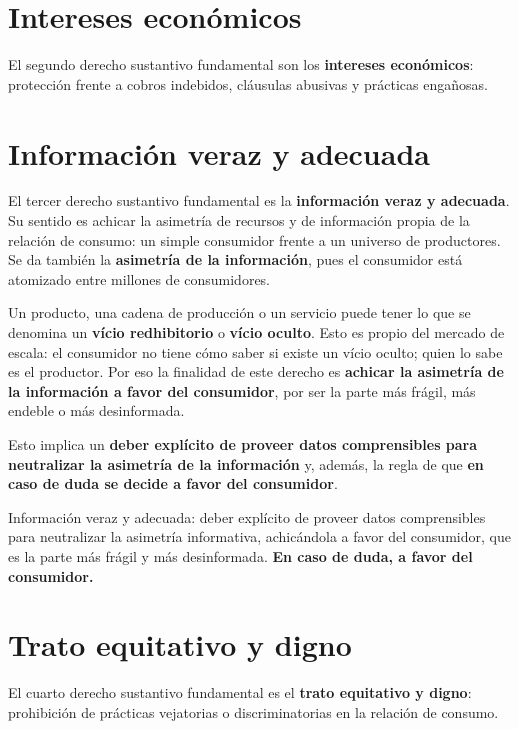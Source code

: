 \documentclass[12pt,oneside]{book}
\begin{document}
\section{Intereses econ\'omicos}

El segundo derecho sustantivo fundamental son los \textbf{intereses econ\'omicos}: protecci\'on frente a cobros indebidos, cl\'ausulas abusivas y pr\'acticas enga\~nosas.

\section{Informaci\'on veraz y adecuada}

El tercer derecho sustantivo fundamental es la \textbf{informaci\'on veraz y adecuada}. Su sentido es achicar la asimetr\'ia de recursos y de informaci\'on propia de la relaci\'on de consumo: un simple consumidor frente a un universo de productores. Se da tambi\'en la \textbf{asimetr\'ia de la informaci\'on}, pues el consumidor est\'a atomizado entre millones de consumidores.

Un producto, una cadena de producci\'on o un servicio puede tener lo que se denomina un \textbf{v\'icio redhibitorio} o \textbf{v\'icio oculto}. Esto es propio del mercado de escala: el consumidor no tiene c\'omo saber si existe un v\'icio oculto; quien lo sabe es el productor. Por eso la finalidad de este derecho es \textbf{achicar la asimetr\'ia de la informaci\'on a favor del consumidor}, por ser la parte m\'as fr\'agil, m\'as endeble o m\'as desinformada.

Esto implica un \textbf{deber expl\'icito de proveer datos comprensibles para neutralizar la asimetr\'ia de la informaci\'on} y, adem\'as, la regla de que \textbf{en caso de duda se decide a favor del consumidor}.

\begin{important}
Informaci\'on veraz y adecuada: deber expl\'icito de proveer datos comprensibles para neutralizar la asimetr\'ia informativa, achic\'andola a favor del consumidor, que es la parte m\'as fr\'agil y m\'as desinformada. \textbf{En caso de duda, a favor del consumidor.}
\end{important}

\section{Trato equitativo y digno}

El cuarto derecho sustantivo fundamental es el \textbf{trato equitativo y digno}: prohibici\'on de pr\'acticas vejatorias o discriminatorias en la relaci\'on de consumo.
\end{document}
